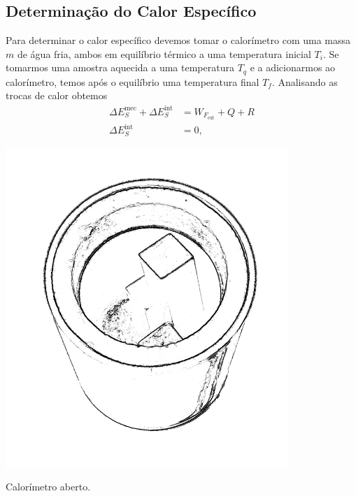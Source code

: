 \subsection{Determinação do Calor Específico}

Para determinar o calor específico devemos tomar o calorímetro com uma massa $m$ de água fria, ambos em equilíbrio térmico a uma temperatura inicial $T_i$. Se tomarmos uma amostra aquecida a uma temperatura $T_q$ e a adicionarmos ao calorímetro, temos após o equilíbrio uma temperatura final $T_f$. Analisando as trocas de calor obtemos
\begin{align}
    \Delta E_S^{\text{mec}} + \Delta E_S^{\text{int}} &= W_{F_{\text{ext}}} + Q + R \\
    \Delta E_S^{\text{int}} &= 0,
\end{align}

\begin{marginfigure}[2cm]
	\centering
	\includegraphics[width=0.8\textwidth]{Ilustrations/Calorimetro.png}
	\caption{Calorímetro aberto.}
\end{marginfigure}

